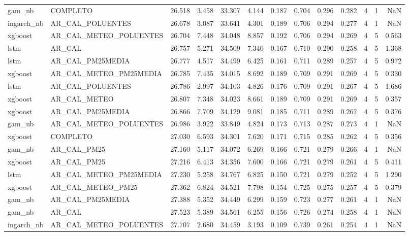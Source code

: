 \begin{tabular}{llrrrrrrrrrrr}
gam_nb & COMPLETO & 26.518 & 3.458 & 33.307 & 4.144 & 0.187 & 0.704 & 0.296 & 0.282 & 4 & 1 & NaN \\
ingarch_nb & AR_CAL_POLUENTES & 26.678 & 3.087 & 33.641 & 4.301 & 0.189 & 0.706 & 0.294 & 0.277 & 4 & 1 & NaN \\
xgboost & AR_CAL_METEO_POLUENTES & 26.704 & 7.448 & 34.048 & 8.857 & 0.192 & 0.706 & 0.294 & 0.269 & 4 & 5 & 0.563 \\
lstm & AR_CAL & 26.757 & 5.271 & 34.509 & 7.340 & 0.167 & 0.710 & 0.290 & 0.258 & 4 & 5 & 1.368 \\
lstm & AR_CAL_PM25MEDIA & 26.777 & 4.517 & 34.499 & 6.425 & 0.161 & 0.711 & 0.289 & 0.257 & 4 & 5 & 0.972 \\
xgboost & AR_CAL_METEO_PM25MEDIA & 26.785 & 7.435 & 34.015 & 8.692 & 0.189 & 0.709 & 0.291 & 0.269 & 4 & 5 & 0.330 \\
lstm & AR_CAL_POLUENTES & 26.786 & 2.997 & 34.103 & 4.826 & 0.176 & 0.709 & 0.291 & 0.267 & 4 & 5 & 1.686 \\
xgboost & AR_CAL_METEO & 26.807 & 7.348 & 34.023 & 8.661 & 0.189 & 0.709 & 0.291 & 0.269 & 4 & 5 & 0.357 \\
xgboost & AR_CAL_PM25MEDIA & 26.866 & 7.709 & 34.129 & 9.081 & 0.185 & 0.711 & 0.289 & 0.267 & 4 & 5 & 0.376 \\
gam_nb & AR_CAL_METEO_POLUENTES & 26.986 & 3.922 & 33.849 & 4.824 & 0.173 & 0.713 & 0.287 & 0.273 & 4 & 1 & NaN \\
xgboost & COMPLETO & 27.030 & 6.593 & 34.301 & 7.620 & 0.171 & 0.715 & 0.285 & 0.262 & 4 & 5 & 0.356 \\
gam_nb & AR_CAL_PM25 & 27.160 & 5.117 & 34.072 & 6.269 & 0.166 & 0.721 & 0.279 & 0.266 & 4 & 1 & NaN \\
xgboost & AR_CAL_PM25 & 27.216 & 6.413 & 34.356 & 7.600 & 0.166 & 0.721 & 0.279 & 0.261 & 4 & 5 & 0.411 \\
lstm & AR_CAL_METEO_PM25MEDIA & 27.230 & 5.258 & 34.767 & 6.825 & 0.150 & 0.721 & 0.279 & 0.252 & 4 & 5 & 1.290 \\
xgboost & AR_CAL_METEO_PM25 & 27.362 & 6.824 & 34.521 & 7.798 & 0.154 & 0.725 & 0.275 & 0.257 & 4 & 5 & 0.379 \\
gam_nb & AR_CAL_PM25MEDIA & 27.388 & 5.352 & 34.449 & 6.299 & 0.159 & 0.723 & 0.277 & 0.261 & 4 & 1 & NaN \\
gam_nb & AR_CAL & 27.523 & 5.389 & 34.561 & 6.255 & 0.156 & 0.726 & 0.274 & 0.258 & 4 & 1 & NaN \\
ingarch_nb & AR_CAL_METEO_POLUENTES & 27.707 & 2.680 & 34.459 & 3.193 & 0.109 & 0.739 & 0.261 & 0.254 & 4 & 1 & NaN \\

\end{tabular}
